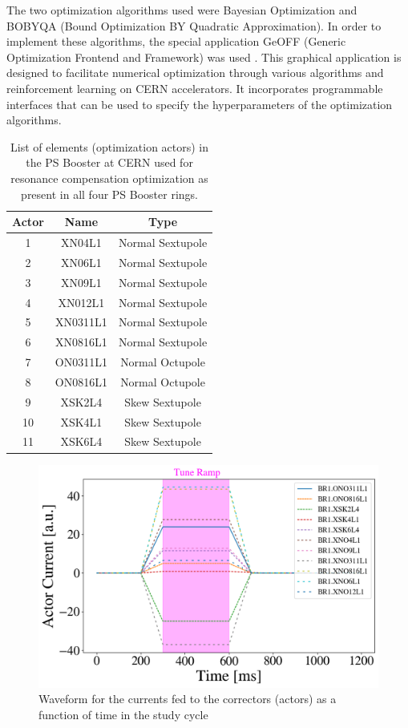 The two optimization algorithms used were Bayesian Optimization and BOBYQA (Bound Optimization BY Quadratic Approximation). In order to implement these algorithms, the special application GeOFF (Generic Optimization Frontend and Framework) was used \cite{geoff}. This graphical application is designed to facilitate numerical optimization through various algorithms and reinforcement learning on CERN accelerators. It incorporates programmable interfaces that can be used to specify the hyperparameters of the optimization algorithms.  

\begin{table}[H]
    \centering
    \caption{List of elements (optimization actors) in the PS Booster at CERN used for resonance compensation optimization as present in all four PS Booster rings.}
    \label{tab:psbcomp}
    \begin{tabular}{|c|c|c|}
    \hline
    \textbf{Actor} & \textbf{Name} & \textbf{Type}    \\ \hline
    1 & XN04L1    & Normal Sextupole \\ \hline
    2 & XN06L1    & Normal Sextupole \\ \hline
    3 & XN09L1    & Normal Sextupole \\ \hline
    4 & XN012L1    & Normal Sextupole \\ \hline
    5 & XN0311L1    & Normal Sextupole   \\ \hline
    6 & XN0816L1    & Normal Sextupole   \\ \hline
    7 & ON0311L1    & Normal Octupole  \\ \hline
    8 & ON0816L1    & Normal Octupole   \\ \hline
    9 & XSK2L4    & Skew Sextupole  \\ \hline
    10 & XSK4L1    & Skew Sextupole   \\ \hline
    11 & XSK6L4    & Skew Sextupole   \\ \hline
    \end{tabular}
\end{table}

\begin{figure}[H]
    \centering
    \includegraphics[width=\linewidth]{chapter5/actor_currents.png}
    \caption{Waveform for the currents fed to the correctors (actors) as a function of time in the study cycle}
    \label{fig:actorcurrents}
\end{figure}

